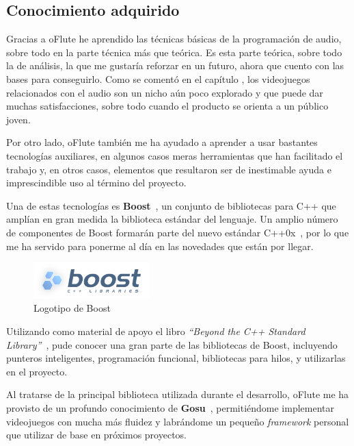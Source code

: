 \subsection{Conocimiento adquirido}

Gracias a oFlute he aprendido las técnicas básicas de la programación de audio,
sobre todo en la parte técnica más que teórica. Es esta parte teórica, sobre
todo la de análisis, la que me gustaría reforzar en un futuro, ahora que cuento
con las bases para conseguirlo. Como se comentó en el capítulo
\textit{}, los videojuegos relacionados con el audio
son un nicho aún poco explorado y que puede dar muchas satisfacciones, sobre
todo cuando el producto se orienta a un público joven.

Por otro lado, oFlute también me ha ayudado a aprender a usar bastantes
tecnologías auxiliares, en algunos casos meras herramientas que han facilitado
el trabajo y, en otros casos, elementos que resultaron ser de inestimable ayuda
e imprescindible uso al término del proyecto.

Una de estas tecnologías es \textbf{Boost}~\cite{boost}, un conjunto de
bibliotecas para C++ que amplían en gran medida la biblioteca estándar del
lenguaje. Un amplio número de componentes de Boost formarán parte del nuevo
estándar C++0x~\cite{cpp0x}, por lo que me ha servido para ponerme al día en las
novedades que están por llegar.

\begin{figure}[htp!]
  \centering
  \includegraphics[width=0.4\textwidth]{8_conclusiones/imagen_logoboost}
  \caption{Logotipo de Boost}
\end{figure}

Utilizando como material de apoyo el libro \textit{``Beyond the C++ Standard
  Library''}~\cite{libroboost}, pude conocer una gran parte de las bibliotecas
de Boost, incluyendo punteros inteligentes, programación funcional, bibliotecas
para hilos, y utilizarlas en el proyecto.

Al tratarse de la principal biblioteca utilizada durante el desarrollo, oFlute
me ha provisto de un profundo conocimiento de \textbf{Gosu}~\cite{gosu},
permitiéndome implementar videojuegos con mucha más fluidez y labrándome un
pequeño \textit{framework} personal que utilizar de base en próximos
proyectos. 

